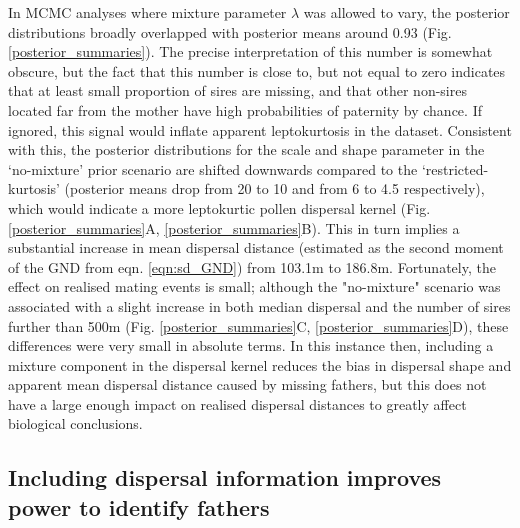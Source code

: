 \documentclass[10pt, a4paper, twocolumn]{article} %
\begin{document}
In MCMC analyses where mixture parameter $\lambda$ was allowed to vary, the posterior distributions broadly overlapped with posterior means around 0.93 (Fig. \ref{posterior_summaries}).
The precise interpretation of this number is somewhat obscure, but the fact that this number is close to, but not equal to zero indicates that at least small proportion of sires are missing, and that other non-sires located far from the mother have high probabilities of paternity by chance.
If ignored, this signal would inflate apparent leptokurtosis in the dataset.
Consistent with this, the posterior distributions for the scale and shape parameter in the ‘no-mixture’ prior scenario are shifted downwards compared to the ‘restricted-kurtosis’ (posterior means drop from 20 to 10 and from 6 to 4.5 respectively), which would indicate a more leptokurtic pollen dispersal kernel (Fig. \ref{posterior_summaries}A, \ref{posterior_summaries}B).
This in turn implies a substantial increase in mean dispersal distance (estimated as the second moment of the GND from eqn. \ref{eqn:sd_GND}) from 103.1m to 186.8m.
Fortunately, the effect on realised mating events is small; although the "no-mixture" scenario was associated with a slight increase in both median dispersal and the number of sires further than 500m (Fig. \ref{posterior_summaries}C, \ref{posterior_summaries}D), these differences were very small in absolute terms.
In this instance then, including a mixture component in the dispersal kernel reduces the bias in dispersal shape and apparent mean dispersal distance caused by missing fathers, but this does not have a large enough impact on realised dispersal distances to greatly affect biological conclusions.

\subsection{Including dispersal information improves power to identify fathers}
\end{document}
